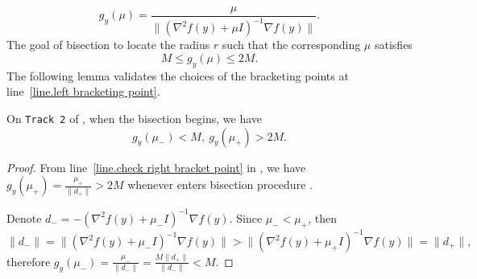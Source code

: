\documentclass{mcom-l}
\newcommand{\cz}[1]{{\color{rosemary}\sffamily [#1]}}
\numberwithin{equation}{section}
\begin{document}
\begin{equation}
    \label{eq.auxiliary function for bisection}
    g_y(\mu) = \frac{\mu}{\|\left (\nabla^2 f(y)+\mu I\right)^{-1}\nabla f(y)\|}.
\end{equation}
The goal of bisection to locate the radius $r$ such that the corresponding $\mu$ satisfies
\begin{equation*}
    M \leq g_y(\mu) \leq 2M.
\end{equation*}
The following lemma validates the choices of the bracketing points at line~\ref{line.left bracketing point}.
\begin{lemma}
    \label{lem.valid bracketing}
    On \texttt{Track 2} of , when the bisection begins, we have
    \begin{equation*}
        g_y(\mu_-) < M, \ g_y(\mu_+) >2M.
    \end{equation*}
\end{lemma}
\begin{proof}
    From line~\ref{line.check right bracket point} in , we have $g_y(\mu_+)=\frac{\mu_+}{\|d_+\|} >2M$ whenever  enters bisection procedure .

    Denote $d_- = -\left(\nabla^2 f(y)+\mu_-I\right)^{-1}\nabla f(y)$. Since $\mu_- <\mu_+$, then
    \begin{equation*}
        \|d_-\|=\| \left (\nabla ^2 f(y)+\mu_- I\right )^{-1} \nabla f(y)\|>\| \left (\nabla ^2 f(y)+\mu_+ I\right )^{-1} \nabla f(y)\| = \|d_+\|,
    \end{equation*}
    therefore $g_y(\mu_-) = \frac{\mu_-}{\|d_-\|}=\frac{M\|d_+\|}{\|d_-\|}< M$.
\end{proof}
\end{document}
